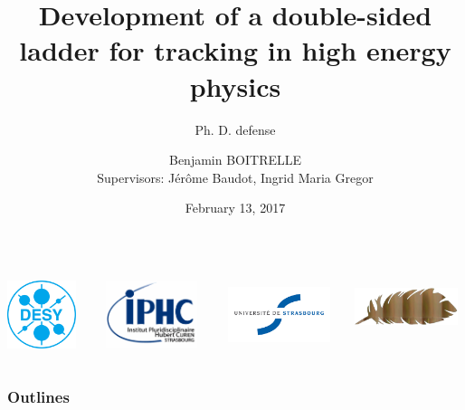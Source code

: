 \documentclass{beamer}
\title[Ph. D. defense]{Development of a double-sided ladder for tracking in high energy physics}
\subtitle{Ph. D. defense}
\institute{Strasbourg}
\author[Benjamin BOITRELLE]{Benjamin BOITRELLE  \\ \scriptsize{Supervisors: Jérôme Baudot, Ingrid Maria Gregor}} %
\date{February 13, 2017}
\begin{document}
  \begin{frame}[plain]
    \maketitle
    \begin{columns}[t]
        \begin{column}{2cm}
            \includegraphics[width = 2cm, height = 2cm]{Pictures/DESY-Logo.png}
        \end{column}

        \begin{column}{3cm}
            \includegraphics[width = 3cm, height = 2cm]{Pictures/logo_IPHC_10cm.png}
        \end{column}
        \begin{column}{3cm}
            \includegraphics[width = 3cm, height = 2cm]{Pictures/logo_uni_stra.jpg}
        \end{column}        
        \begin{column}{3cm}
            \includegraphics[width = 3cm, height = 1.5cm]{Pictures/logo_plume.png}
        \end{column}
    \end{columns}

  \end{frame}

  \begin{frame}[plain]
    \frametitle{Outlines}

    \tableofcontents[subsectionstyle=hide]
  \end{frame}
\end{document}
